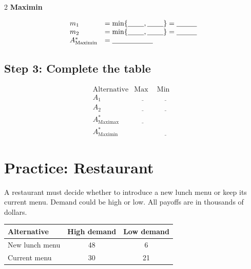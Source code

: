 \begin{multicols}{2}
		\textbf{Maximin}
		
		\[
		\begin{array}{ll}
			m_1 &= \min\{\underline{\hspace{0.8cm}},\underline{\hspace{0.8cm}}\}
			=\underline{\hspace{1cm}} \\
			m_2 &= \min\{\underline{\hspace{0.8cm}},\underline{\hspace{0.8cm}}\}
			=\underline{\hspace{1cm}} \\
			A^*_{\mathrm{Maximin}} &= \underline{\hspace{2cm}}
		\end{array}
		\]
		
		\subsection*{Step 3: Complete the table}
		
		\[
		\begin{array}{c|c|c}
			\text{Alternative} & \text{Max} & \text{Min}\\
			\hline
			A_1 & \underline{\hspace{1cm}} & \underline{\hspace{1cm}}\\
			A_2 & \underline{\hspace{1cm}} & \underline{\hspace{1cm}}\\
			\hline
			A^*_{\mathrm{Maximax}} & \underline{\hspace{1cm}} & \\
			A^*_{\mathrm{Maximin}} & & \underline{\hspace{1cm}}
		\end{array}
		\]
		
		
		\section{Practice: Restaurant}
		A restaurant must decide whether to introduce a new lunch menu or keep
		its current menu. Demand could be high or low. All payoffs are in thousands of dollars.
		\begin{center}
			\renewcommand{\arraystretch}{1.3}
			\small
			\begin{tabular}{lcc}
				\toprule
				Alternative & High demand & Low demand \\
				\midrule
				New lunch menu & 48 & 6 \\
				Current menu & 30 & 21 \\
				\bottomrule
			\end{tabular}
		\end{center}
		\vspace{-5mm}
		

\end{multicols}

